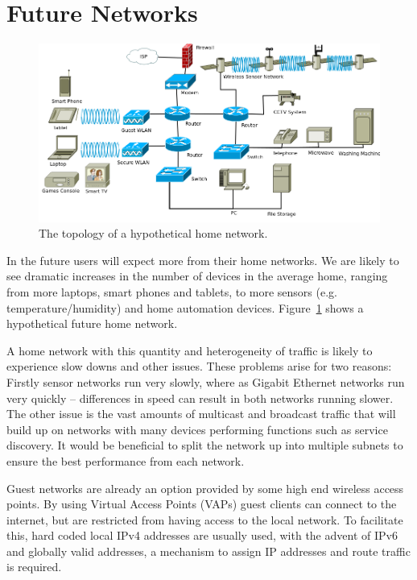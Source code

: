 \documentclass[12pt,a4paper,twoside]{report}
\begin{document}
\section{Future Networks}
\begin{figure}
\begin{center}
	\includegraphics[width=\linewidth]{../Diagrams/Network/FutureHomenet.png}
	\caption{The topology of a hypothetical home network.}\label{fig:future_net}
\end{center}
\end{figure}
In the future users will expect more from their home networks. We are likely to
see dramatic increases in the number of devices in the average home, ranging
from more laptops, smart phones and tablets, to more sensors (e.g.\@
temperature/humidity) and home automation devices. Figure~\ref{fig:future_net}
shows a hypothetical future home network.

A home network with this quantity and heterogeneity of traffic is likely to
experience slow downs and other issues. These problems arise for two reasons:
Firstly sensor networks run very slowly, where as Gigabit Ethernet networks run
very quickly -- differences in speed can result in both networks running
slower. The other issue is the vast amounts of multicast and broadcast
traffic that will build up on networks with many devices performing functions
such as service discovery. It would be beneficial to split the network up into
multiple subnets to ensure the best performance from each network. 

Guest networks are already an option provided by some high end wireless access
points. By using Virtual Access Points (VAPs)  guest clients can connect to the internet, but are restricted from
having access to the local network. To facilitate this, hard coded local
IPv4 addresses are usually used, with the advent of IPv6 and globally valid
addresses, a mechanism to assign IP addresses and route traffic is required. 
\end{document}
